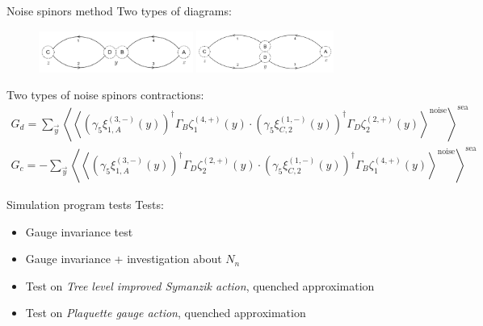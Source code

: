 \documentclass{beamer}
\begin{document}
\begin{frame}{Noise spinors method}
      Two types of diagrams:
      \begin{center}
            \begin{figure}
                  \includegraphics[width=0.45\textwidth]{../thesis-tex/imgs-MSc-thesis/Wick_stochastic_disc.png}
                  \includegraphics[width=0.4\textwidth]{../thesis-tex/imgs-MSc-thesis/Wick_stochastic_conn.png}
            \end{figure}
      \end{center}
      Two types of noise spinors contractions:
      \begin{equation*}
            \begin{gathered}
                  G_d =   \sum_{\vec y} \left\langle \left\langle \left(\gamma_5\xi^{(3,-)}_{1,A} (y) \right)^\dag \Gamma_B \zeta^{(4,+)}_1 (y) \cdot \left(\gamma_5\xi^{(1,-)}_{C,2} (y) \right)^\dag \Gamma_D \zeta^{(2,+)}_2 (y) \right\rangle^\text{noise} \right\rangle^{\text{sea}} \\
                  G_c = - \sum_{\vec y} \left\langle \left\langle \left(\gamma_5\xi^{(3,-)}_{1,A} (y) \right)^\dag \Gamma_D \zeta^{(2,+)}_2 (y) \cdot \left(\gamma_5\xi^{(1,-)}_{C,2} (y) \right)^\dag \Gamma_B \zeta^{(4,+)}_1 (y) \right\rangle^\text{noise} \right\rangle^{\text{sea}}
            \end{gathered}
      \end{equation*}
\end{frame}

\begin{frame}{Simulation program tests}
      Tests:
      \begin{itemize}
            \item Gauge invariance test
            \item Gauge invariance + investigation about $N_n$
            \item Test on \emph{Tree level improved Symanzik action}, quenched approximation
            \item Test on \emph{Plaquette gauge action}, quenched approximation
      \end{itemize}
\end{frame}
\end{document}
